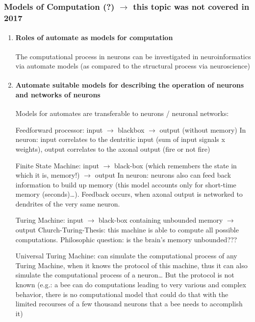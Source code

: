 \documentclass[12pt,article,oneside,a4paper]{memoir}
\begin{document}
\subsubsection{Models of Computation (?) $\rightarrow$ this topic was not covered in 2017}
\begin{enumerate}
\item \paragraph{Roles of automate as models for computation}

The computational process in neurons can be investigated in neuroinformatics via   automate models (as   compared to the structural process via neuroscience)

\item \paragraph{Automate suitable models for describing the operation of neurons and networks of neurons}

Models for automates are transferable to neurons / neuronal networks:

	Feedforward processor: input $\rightarrow$ blackbox $\rightarrow$ output (without memory)
	In neuron: input correlates to the dentritic input (sum of input signals x weights), output correlates to the axonal output (fire or not fire)

	Finite State Machine: input $\rightarrow$ black-box (which remembers the state in which it is, memory!) $\rightarrow$ output
	In neuron: neurons also can feed back information to build up memory (this model accounts only for short-time memory (seconds)…). Feedback occurs, when axonal output is networked to dendrites of the very same neuron.

	Turing Machine: input $\rightarrow$ black-box containing unbounded memory $\rightarrow$ output
	Church-Turing-Thesis: this machine is able to compute all possible computations. Philosophic question: is the brain’s memory unbounded???
	
	Universal Turing Machine: can simulate the computational process of any Turing Machine, when it knows the protocol of this machine, thus it can also simulate the computational process of a neuron… But the protocol is not known (e.g.: a bee can do computations leading to very various and complex behavior, there is no computational model that could do that with the limited recourses of a few thousand neurons that a bee needs to accomplish it)


\end{enumerate}
\end{document}
